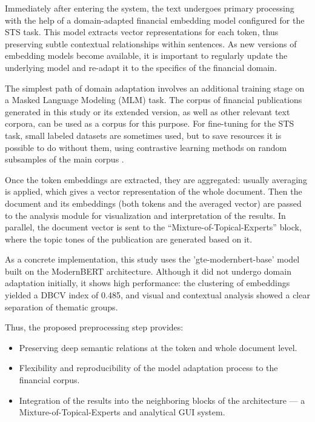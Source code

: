 Immediately after entering the system, the text undergoes primary processing with the help of a domain-adapted
financial embedding model configured for the STS task. This model extracts vector
representations for each token, thus preserving subtle contextual relationships within sentences. As new versions
of embedding models become available, it is important to regularly update the underlying model and re-adapt it
to the specifics of the financial domain.

The simplest path of domain adaptation involves an additional training stage on a Masked Language Modeling (MLM)
task. The corpus of financial publications generated in this study or its extended version, as well as other relevant
text corpora, can be used as a corpus for this purpose. For fine-tuning for the STS task, small labeled datasets
are sometimes used, but to save resources it is possible to do without them, using contrastive learning methods
on random subsamples of the main corpus \parencite{gao2021simcse}.

Once the token embeddings are extracted, they are aggregated: usually averaging is applied, which gives a vector
representation of the whole document. Then the document and its embeddings (both tokens and the averaged vector)
are passed to the analysis module for visualization and interpretation of the results. In parallel, the document
vector is sent to the “Mixture-of-Topical-Experts” block, where the topic tones of the publication are generated
based on it.

As a concrete implementation, this study uses the 'gte-modernbert-base' model built on the ModernBERT architecture.
Although it did not undergo domain adaptation initially, it shows high performance: the clustering of embeddings
yielded a DBCV index of 0.485, and visual and contextual analysis showed a clear separation of thematic groups.

Thus, the proposed preprocessing step provides:

\begin{itemize}
    \item Preserving deep semantic relations at the token and whole document level.
    \item Flexibility and reproducibility of the model adaptation process to the financial corpus.
    \item Integration of the results into the neighboring blocks of the architecture --- a Mixture-of-Topical-Experts
    and analytical GUI system.
\end{itemize}

